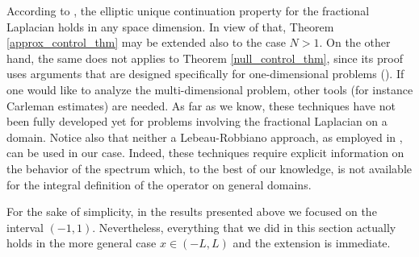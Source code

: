 \begin{remark}
According to \cite{fall2014unique}, the elliptic unique continuation property for the fractional Laplacian holds in any space dimension. In view of that, Theorem \ref{approx_control_thm} may be extended also to the case $N>1$. On the other hand, the same does not applies to Theorem \ref{null_control_thm}, since its proof uses arguments that are designed specifically for one-dimensional problems (\cite{fattorini1971exact}). If one would like to analyze the multi-dimensional problem, other tools (for instance Carleman estimates) are needed. As far as we know, these techniques have not been fully developed yet for problems involving the fractional Laplacian on a domain. Notice also that neither a Lebeau-Robbiano approach, as employed in \cite{miller2006controllability}, can be used in our case. Indeed, these techniques require explicit information on the behavior of the spectrum which, to the best of our knowledge, is not available for the integral definition of the operator on general domains.
\end{remark}

\begin{remark}
For the sake of simplicity, in the results presented above we focused on the interval $(-1,1)$. Nevertheless, everything that we did in this section actually holds in the more general case $x\in(-L,L)$ and the extension is immediate.
\end{remark}



